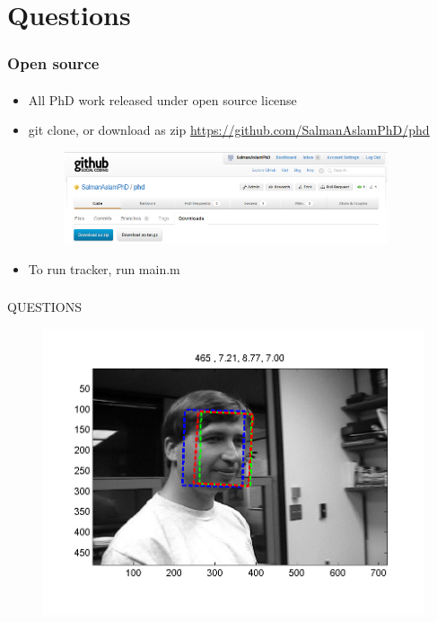 \section{Questions}
\begin{frame}
\frametitle{Open source}
\framesubtitle{}
\logoCSIPCPL\mypagenum
\setcounter{subfigure}{0}
\begin{itemize}
\item All PhD work released under open source license
\item git clone, or download as zip
{\color{blue}\underline{\url{https://github.com/SalmanAslamPhD/phd}}}
\begin{figure}
\includegraphics[width=0.9\textwidth]{thesis/github.png}
\end{figure}
\item To run tracker, run main.m
\end{itemize}
\end{frame}

\begin{frame}
\frametitle{}
\logoCSIPCPL\mypagenum
		QUESTIONS
\begin{figure}
\includegraphics[width=1.0\textwidth]{thesis/00465.png}
\end{figure}

\end{frame}



